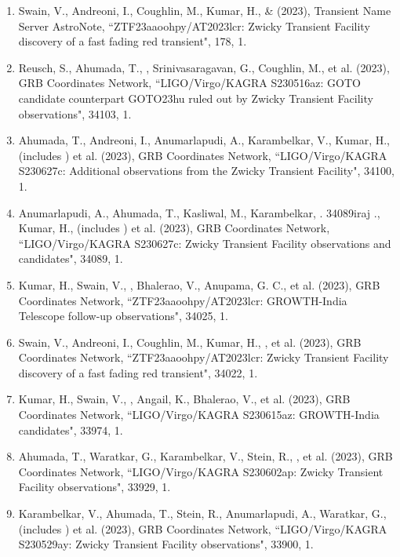 \begin{enumerate}
\item Swain, V., Andreoni, I., Coughlin, M., Kumar, H., \& \me (2023), Transient Name Server AstroNote, {``ZTF23aaoohpy/AT2023lcr: Zwicky Transient Facility discovery of a fast fading red transient"}, 178, 1.

\item Reusch, S., Ahumada, T., \me, Srinivasaragavan, G., Coughlin, M., et al. (2023), GRB Coordinates Network, {``LIGO/Virgo/KAGRA S230516az: GOTO candidate counterpart GOTO23hu ruled out by Zwicky Transient Facility observations"}, 34103, 1.

\item Ahumada, T., Andreoni, I., Anumarlapudi, A., Karambelkar, V., Kumar, H., (includes \me) et al. (2023), GRB Coordinates Network, {``LIGO/Virgo/KAGRA S230627c: Additional observations from the Zwicky Transient Facility"}, 34100, 1.

\item Anumarlapudi, A., Ahumada, T., Kasliwal, M., Karambelkar, . 34089iraj ., Kumar, H., (includes \me) et al. (2023), GRB Coordinates Network, {``LIGO/Virgo/KAGRA S230627c: Zwicky Transient Facility observations and candidates"}, 34089, 1.

\item Kumar, H., Swain, V., \me, Bhalerao, V., Anupama, G. C., et al. (2023), GRB Coordinates Network, {``ZTF23aaoohpy/AT2023lcr: GROWTH-India Telescope follow-up observations"}, 34025, 1.

\item Swain, V., Andreoni, I., Coughlin, M., Kumar, H., \me, et al. (2023), GRB Coordinates Network, {``ZTF23aaoohpy/AT2023lcr: Zwicky Transient Facility discovery of a fast fading red transient"}, 34022, 1.

\item Kumar, H., Swain, V., \me, Angail, K., Bhalerao, V., et al. (2023), GRB Coordinates Network, {``LIGO/Virgo/KAGRA S230615az: GROWTH-India candidates"}, 33974, 1.

\item Ahumada, T., Waratkar, G., Karambelkar, V., Stein, R., \me, et al. (2023), GRB Coordinates Network, {``LIGO/Virgo/KAGRA S230602ap: Zwicky Transient Facility observations"}, 33929, 1.

\item Karambelkar, V., Ahumada, T., Stein, R., Anumarlapudi, A., Waratkar, G.,  (includes \me) et al. (2023), GRB Coordinates Network, {``LIGO/Virgo/KAGRA S230529ay: Zwicky Transient Facility observations"}, 33900, 1.


\end{enumerate}
